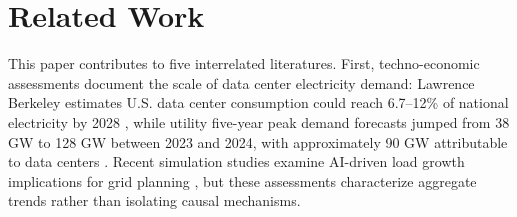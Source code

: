 \documentclass[a4paper,fleqn,longmktitle]{cas-sc}
\newcommand{\aruna}[1]{\textcolor{blue}{Aruna[#1]}}
\theoremstyle{plain}
\theoremstyle{definition}
\begin{document}


\section{Related Work}

This paper contributes to five interrelated literatures. First, techno-economic assessments document the scale of data center electricity demand: Lawrence Berkeley estimates U.S. data center consumption could reach 6.7--12\% of national electricity by 2028 \cite{shehabi2024}, while utility five-year peak demand forecasts jumped from 38 GW to 128 GW between 2023 and 2024, with approximately 90 GW attributable to data centers \cite{gridstrategies2025}. Recent simulation studies examine AI-driven load growth implications for grid planning \cite{lin2024exploding, chien2023adapting}, but these assessments characterize aggregate trends rather than isolating causal mechanisms.
\end{document}
